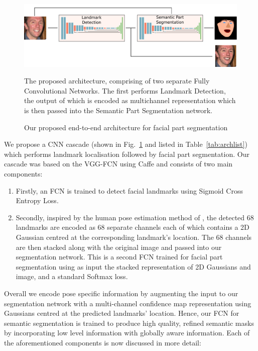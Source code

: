 \begin{figure}
\includegraphics[width=\linewidth]{figs/Proposed.pdf}
\caption{Our proposed end-to-end architecture for facial part
  segmentation}{The proposed architecture, comprising of two separate
  Fully Convolutional Networks. The first performs Landmark Detection,
  the output of which is encoded as multichannel representation which
  is then passed into the Semantic Part Segmentation network.}
\label{fig:proposed}
\end{figure}

We propose a CNN cascade (shown in Fig.~\ref{fig:proposed} and listed
in Table~\ref{tab:archlist}) which performs landmark localisation
followed by facial part segmentation. Our cascade was based on the
VGG-FCN \cite{simonyan2014vgg,long2015fully} using Caffe
\cite{jia2014caffe} and consists of two main components:
\begin{enumerate}
\item Firstly, an FCN is trained to detect facial landmarks using
  Sigmoid Cross Entropy Loss.
\item Secondly, inspired by the human pose estimation method of
  \cite{carreira2016human}, the detected 68 landmarks are encoded as
  68 separate channels each of which contains a 2D Gaussian centred
  at the corresponding landmark's location. The 68 channels are then
  stacked along with the original image and passed into our
  segmentation network. This is a second FCN trained for facial part
  segmentation using as input the stacked representation of 2D
  Gaussians and image, and a standard Softmax loss.
\end{enumerate}

Overall we encode pose specific information by augmenting the input to
our segmentation network with a multi-channel confidence map
representation using Gaussians centred at the predicted landmarks'
location. Hence, our FCN for semantic segmentation is trained to
produce high quality, refined semantic masks by incorporating low
level information with globally aware information. Each of the
aforementioned components is now discussed in more detail:

